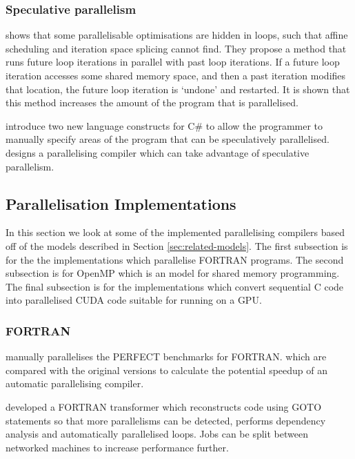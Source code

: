 \documentclass[conference]{IEEEtran}
\begin{document}
\subsubsection{Speculative parallelism}
\textcite{Zhong2008} shows that some parallelisable optimisations are hidden in loops, such that affine scheduling and iteration space splicing cannot find. They propose a method that runs future loop iterations in parallel with past loop iterations. If a future loop iteration accesses some shared memory space, and then a past iteration modifies that location, the future loop iteration is `undone' and restarted. It is shown that this method increases the amount of the program that is parallelised.

\textcite{Prabhu2010} introduce two new language constructs for C\# to allow the programmer to manually specify areas of the program that can be speculatively parallelised. \textcite{Yiapanis2015} designs a parallelising compiler which can take advantage of speculative parallelism.

\subsection{Parallelisation Implementations}
In this section we look at some of the implemented parallelising compilers based off of the models described in Section \ref{sec:related-models}. The first subsection is for the the implementations which parallelise FORTRAN programs. The second subsection is for OpenMP which is an model for shared memory programming. The final subsection is for the implementations which convert sequential C code into parallelised CUDA code suitable for running on a GPU.


\subsubsection{FORTRAN}
\textcite{Eigenmann1998} manually parallelises the PERFECT benchmarks for FORTRAN. which are compared with the original versions to calculate the potential speedup of an automatic parallelising compiler.

\textcite{DHollander1998} developed a FORTRAN transformer which reconstructs code using GOTO statements so that more parallelisms can be detected, performs dependency analysis and automatically parallelised loops. Jobs can be split between networked machines to increase performance further.
\end{document}
